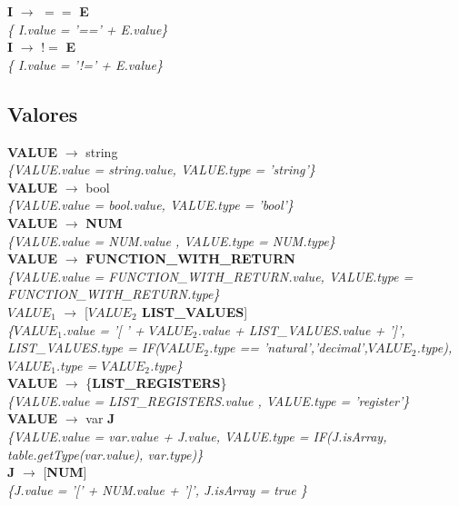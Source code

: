 \documentclass[10pt,a4paper]{article}
\begin{document}
\textbf{I} $\rightarrow$ $==$ \textbf{E}\\
\textit{\{ I.value =  '==' + E.value\}} \\

\textbf{I} $\rightarrow$ $!=$ \textbf{E}\\
\textit{\{ I.value =  '!=' + E.value\}} \\

\subsection{Valores}
\textbf{VALUE} $\rightarrow$ string \\
\textit{\{VALUE.value = string.value, VALUE.type = 'string'\}} \\

\textbf{VALUE} $\rightarrow$ bool   \\
\textit{\{VALUE.value = bool.value, VALUE.type = 'bool'\}} \\

\textbf{VALUE} $\rightarrow$ \textbf{NUM}   \\
\textit{\{VALUE.value =  NUM.value , VALUE.type =  NUM.type\}} \\

\textbf{VALUE} $\rightarrow$ \textbf{FUNCTION\_WITH\_RETURN} \\
\textit{\{VALUE.value =  FUNCTION\_WITH\_RETURN.value, VALUE.type = FUNCTION\_WITH\_RETURN.type\}} \\

\textbf{$VALUE_1$} $\rightarrow$ [\textbf{$VALUE_2$ LIST\_VALUES}]   \\
\textit{\{$VALUE_1$.value =  '[ ' + $VALUE_2$.value + LIST\_VALUES.value + ']', LIST\_VALUES.type = IF($VALUE_2$.type == 'natural','decimal',$VALUE_2$.type), $VALUE_1$.type = $VALUE_2$.type\}} \\

\textbf{VALUE} $\rightarrow$ \{\textbf{LIST\_REGISTERS}\} \\
\textit{\{VALUE.value =  LIST\_REGISTERS.value , VALUE.type = 'register'\}} \\

\textbf{VALUE} $\rightarrow$ var \textbf{J} \\
\textit{\{VALUE.value =  var.value + J.value, VALUE.type = IF(J.isArray, table.getType(var.value), var.type)\}} \\

\textbf{J} $\rightarrow$ [\textbf{NUM}] \\
\textit{\{J.value = '[' + NUM.value + ']', J.isArray = true   \}} \\
\end{document}

